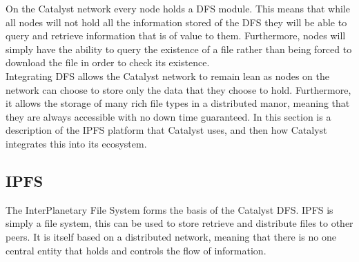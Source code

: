 \documentclass{article}
\begin{document}
On the Catalyst network every node holds a DFS module. This means that while all nodes will not hold all the information stored of the DFS they will be able to query and retrieve information that is of value to them. Furthermore, nodes will simply have the ability to query the existence of a file rather than being forced to download the file in order to check
its existence. \\                                                                                                                                                                                                                                                                                                                                                                                                                                                                                                                                                                                                                                                                                                                                                                                                                                                                                                                                                                                                                                                                                                                                                       

Integrating DFS allows the Catalyst network to remain lean as nodes on the network can choose to store only the data that they choose to hold. Furthermore, it allows the storage of many rich file types in a distributed manor, meaning that they are always accessible with no down time guaranteed. In this section is a description of the IPFS platform that Catalyst uses, and then how Catalyst integrates this into its ecosystem. 


\subsection{IPFS}

The InterPlanetary File System forms the basis of the Catalyst DFS. IPFS is simply a file system, this can be used to store retrieve and distribute files to other peers. It is itself based on a distributed network, meaning that there is no one central entity that holds and controls the flow of information. \\
\end{document}

